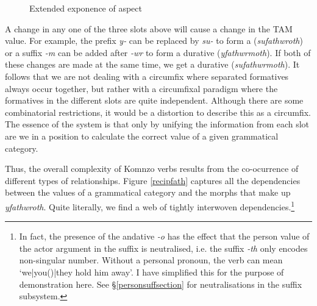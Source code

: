 \begin{figure}
\begin{center}%
\end{center}
\caption{Extended exponence of aspect}
\label{extendfath}
\end{figure}%

A change in any one of the three slots above will cause a change in the TAM value. For example, the prefix \emph{y-} can be replaced by \emph{su-} to form a   (\emph{sufathwroth}) or a suffix \emph{-m} can be added after \emph{-wr} to form a  durative (\emph{yfathwrmoth}). If both of these changes are made at the same time, we get a  durative (\emph{sufathwrmoth}). It follows that we are not dealing with a circumfix where separated formatives always occur together, but rather with a circumfixal paradigm where the formatives in the different slots are quite independent. Although there are some combinatorial restrictions, it would be a distortion to describe this as a circumfix. The essence of the system is that only by unifying the information from each slot are we in a position to calculate the correct value of a given grammatical category.

Thus, the overall complexity of Komnzo verbs results from the co-ocurrence of different types of  relationships. Figure \ref{recipfath} captures all the dependencies between the values of a grammatical category and the morphs that make up \emph{yfathwroth}. Quite literally, we find a web of tightly interwoven dependencies.\footnote{In fact, the presence of the andative \emph{-o} has the effect that the person value of the actor argument in the suffix is neutralised, i.e. the suffix \emph{-th} only encodes non-singular number. Without a personal pronoun, the verb can mean `we|you(\Pl)|they hold him away'. I have simplified this for the purpose of demonstration here. See \S\ref{personsuffsection} for neutralisations in the suffix subsystem.}

